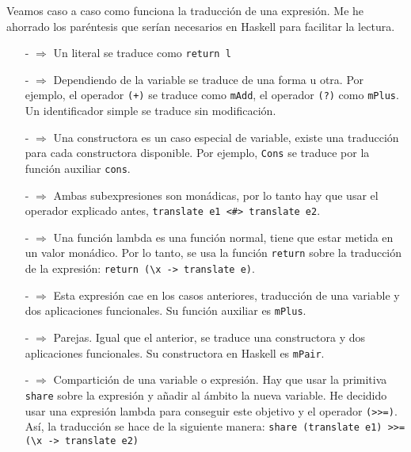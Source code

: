 \documentclass[class=article, crop=false]{standalone}
\begin{document}
Veamos caso a caso como funciona la traducción de una expresión. Me he ahorrado los
paréntesis que serían necesarios en Haskell para facilitar la lectura.

\begin{itemize}
  \item[-]{} $\Rightarrow$ Un literal se traduce como
  \verb`return l`
  
  \item[-]{} $\Rightarrow$ Dependiendo de la variable se traduce de
  una forma u otra. Por ejemplo, el operador \verb`(+)` se traduce como \verb`mAdd`, el
  operador \verb`(?)` como \verb`mPlus`. Un identificador simple se traduce sin modificación.
  
  \item[-]{} $\Rightarrow$ Una constructora es un caso especial de
  variable, existe una traducción para cada constructora disponible. Por ejemplo, \verb`Cons`
  se traduce por la función auxiliar \verb`cons`.

  \item[-]{} $\Rightarrow$ Ambas subexpresiones son
  monádicas, por lo tanto hay que usar el operador explicado antes,
  \verb`translate e1 <#> translate e2`.

  \item[-]{} $\Rightarrow$ Una función
  lambda es una función normal, tiene que estar metida en un valor monádico. Por lo tanto, se
  usa la función \verb`return` sobre la traducción de la expresión:
  \verb`return (\x -> translate e)`.

  \item[-]{}  $\Rightarrow$ Esta expresión cae en los
  casos anteriores, traducción de una variable y dos aplicaciones funcionales. Su función
  auxiliar es \verb`mPlus`.

  \item[-]{} $\Rightarrow$ Parejas. Igual que el
  anterior, se traduce una constructora y dos aplicaciones funcionales. Su constructora en
  Haskell es \verb`mPair`.

  \item[-]{} $\Rightarrow$ Compartición
  de una variable o expresión. Hay que usar la primitiva \verb`share` sobre la expresión y
  añadir al ámbito la nueva variable. He decidido usar una expresión lambda para conseguir
  este objetivo y el operador \verb`(>>=)`. Así, la traducción se hace de la siguiente
  manera: \verb`share (translate e1) >>= (\x -> translate e2)`


\end{itemize}
\end{document}
